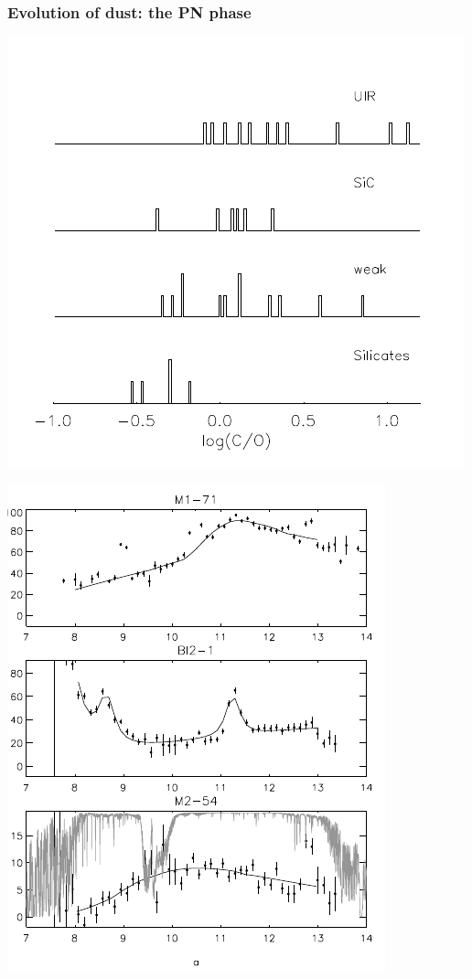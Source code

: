 \begin{frame}\frametitle{Evolution of dust: the PN phase}

\begin{minipage}[t]{0.5\textwidth}
\begin{center}
\includegraphics[width=\textwidth,height=!]{./D/dust_CO.pdf}
\end{center}
\end{minipage}
\hfill
\begin{minipage}[t]{0.45\textwidth}
\begin{center}
\includegraphics[width=\textwidth,height=!]{./D/10umspecs_ex.pdf}

\end{center}
\end{minipage}
\end{frame}
